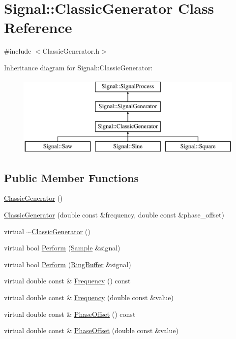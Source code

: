 \hypertarget{classSignal_1_1ClassicGenerator}{\section{Signal\+:\+:Classic\+Generator Class Reference}
\label{classSignal_1_1ClassicGenerator}
}


{\ttfamily \#include $<$Classic\+Generator.\+h$>$}

Inheritance diagram for Signal\+:\+:Classic\+Generator\+:\begin{figure}[H]
\begin{center}
\leavevmode
\includegraphics[height=4.000000cm]{classSignal_1_1ClassicGenerator}
\end{center}
\end{figure}
\subsection*{Public Member Functions}
\begin{DoxyCompactItemize}
\item 
\hyperlink{classSignal_1_1ClassicGenerator_a7e4478904de77156deccb1515f6985cb}{Classic\+Generator} ()
\item 
\hyperlink{classSignal_1_1ClassicGenerator_aa8e7631c9a4a72d42bbe560c02ed7358}{Classic\+Generator} (double const \&frequency, double const \&phase\+\_\+offset)
\item 
virtual \hyperlink{classSignal_1_1ClassicGenerator_a6659174adf402df341e3c0f94564fd37}{$\sim$\+Classic\+Generator} ()
\item 
virtual bool \hyperlink{classSignal_1_1ClassicGenerator_a4a62f329b9cd64d92b07f53c4d593356}{Perform} (\hyperlink{classSignal_1_1Sample}{Sample} \&signal)
\item 
virtual bool \hyperlink{classSignal_1_1ClassicGenerator_a308c13baa66020d44c2227bd58db4b4f}{Perform} (\hyperlink{classSignal_1_1RingBuffer}{Ring\+Buffer} \&signal)
\item 
virtual double const \& \hyperlink{classSignal_1_1SignalGenerator_a96af42ee68f94e9b04d034fd68b73ecd}{Frequency} () const 
\item 
virtual double const \& \hyperlink{classSignal_1_1SignalGenerator_af83b532bf3ddc3637c2fd7a1dfd095cb}{Frequency} (double const \&value)
\item 
virtual double const \& \hyperlink{classSignal_1_1SignalGenerator_ac2538ec946f001e394d2416fda698d1c}{Phase\+Offset} () const 
\item 
virtual double const \& \hyperlink{classSignal_1_1SignalGenerator_ac6a103ff72beaa338f6d18c812522d78}{Phase\+Offset} (double const \&value)
\end{DoxyCompactItemize}
